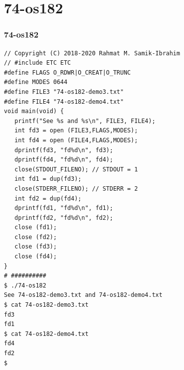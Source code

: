 \documentclass[xcolor=table, notheorems, hyperref={pdfpagelabels=false}]{beamer}
\begin{document}
\section{74-os182}
\begin{frame}[fragile]
\frametitle{74-os182}
\begin{lstlisting}[basicstyle=\ttfamily\tiny]
// Copyright (C) 2018-2020 Rahmat M. Samik-Ibrahim
// #include ETC ETC
#define FLAGS O_RDWR|O_CREAT|O_TRUNC
#define MODES 0644
#define FILE3 "74-os182-demo3.txt"
#define FILE4 "74-os182-demo4.txt"
void main(void) {
   printf("See %s and %s\n", FILE3, FILE4);
   int fd3 = open (FILE3,FLAGS,MODES);
   int fd4 = open (FILE4,FLAGS,MODES);
   dprintf(fd3, "fd%d\n", fd3);
   dprintf(fd4, "fd%d\n", fd4);
   close(STDOUT_FILENO); // STDOUT = 1
   int fd1 = dup(fd3);
   close(STDERR_FILENO); // STDERR = 2
   int fd2 = dup(fd4);
   dprintf(fd1, "fd%d\n", fd1);
   dprintf(fd2, "fd%d\n", fd2);
   close (fd1);
   close (fd2);
   close (fd3);
   close (fd4);
}
# ##########
$ ./74-os182 
See 74-os182-demo3.txt and 74-os182-demo4.txt
$ cat 74-os182-demo3.txt 
fd3
fd1
$ cat 74-os182-demo4.txt 
fd4
fd2
$ 

\end{lstlisting}
\end{frame}

\end{document}
